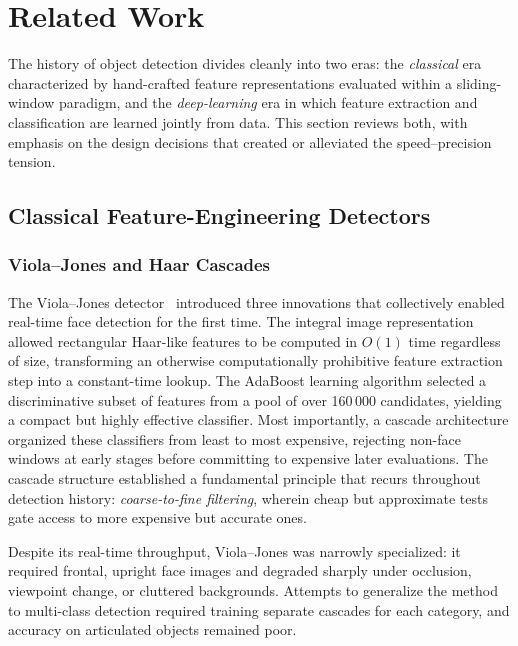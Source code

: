 
\section{Related Work}
\label{sec:related}

The history of object detection divides cleanly into two eras:
the \textit{classical} era characterized by hand-crafted
feature representations evaluated within a sliding-window
paradigm, and the \textit{deep-learning} era in which feature
extraction and classification are learned jointly from data.
This section reviews both, with emphasis on the design
decisions that created or alleviated the speed--precision
tension.

\subsection{Classical Feature-Engineering Detectors}

\subsubsection{Viola--Jones and Haar Cascades}

The Viola--Jones detector~\cite{viola2001rapid} introduced
three innovations that collectively enabled real-time face
detection for the first time.  The integral image representation
allowed rectangular Haar-like features to be computed in $O(1)$
time regardless of size, transforming an otherwise
computationally prohibitive feature extraction step into a
constant-time lookup.  The AdaBoost learning algorithm
selected a discriminative subset of features from a pool of
over 160\,000 candidates, yielding a compact but highly
effective classifier.  Most importantly, a cascade architecture
organized these classifiers from least to most expensive,
rejecting non-face windows at early stages before committing to
expensive later evaluations.  The cascade structure established
a fundamental principle that recurs throughout detection
history: \textit{coarse-to-fine filtering}, wherein cheap but
approximate tests gate access to more expensive but accurate
ones.

Despite its real-time throughput, Viola--Jones was narrowly
specialized: it required frontal, upright face images and
degraded sharply under occlusion, viewpoint change, or
cluttered backgrounds.  Attempts to generalize the method to
multi-class detection required training separate cascades for
each category, and accuracy on articulated objects remained
poor.

